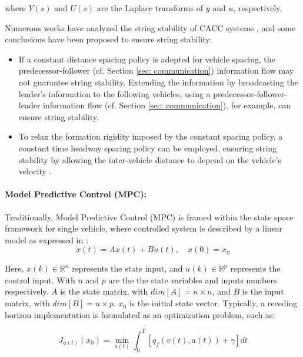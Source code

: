 \noindent where $Y(s)$ and $U(s)$ are the Laplace transforms of $y$ and $u$, respectively.

Numerous works have analyzed the string stability of CACC systems \cite{wang2018review}\cite{nowakowski2010cooperative} \cite{9310215}, and some conclusions have been proposed to ensure string stability: 

\begin{itemize}
    \item If a constant distance spacing policy is adopted for vehicle spacing, the predecessor-follower (cf. Section \ref{sec: communication}) information flow may not guarantee string stability. Extending the information by broadcasting the leader's information to the following vehicles, using a predecessor-follower-leader information flow (cf. Section \ref{sec: communication}), for example, can ensure string stability. 

    \item To relax the formation rigidity imposed by the constant spacing policy, a constant time headway spacing policy can be employed, ensuring string stability by allowing the inter-vehicle distance to depend on the vehicle's velocity \cite{wang2018review}. 
\end{itemize}


\paragraph{Model Predictive Control (MPC): } \label{MPC}
Traditionally, Model Predictive Control (MPC) is framed within the state space framework for single vehicle, where controlled system is described by a linear model as expressed in \cite{stanger2013model}: 
\begin{equation}
\dot{x}(t) = Ax(t) + Bu(t), \quad x(0) = x_{0}
\end{equation}

Here, $x(k) \in \mathbb{R}^n$ represents the state input, and $u(k)\in \mathbb{R}^p$ represents the control input. With $n$ and $p$ are the the state variables and inputs numbers respectively. $A$ is the state matrix, with $dim [A]=n\times n$, and $B$ is the input matrix, with $dim [B]=n\times p$. $x_0$ is the initial state vector. Typically, a receding horizon implementation is formulated as an optimization problem, such as:

\begin{equation}
J_{u(t)}(x_{0}) = \min_{a(t)} \int_{0}^{T} [q_{f}(v(t), a(t)) + \gamma] dt
\end{equation}


